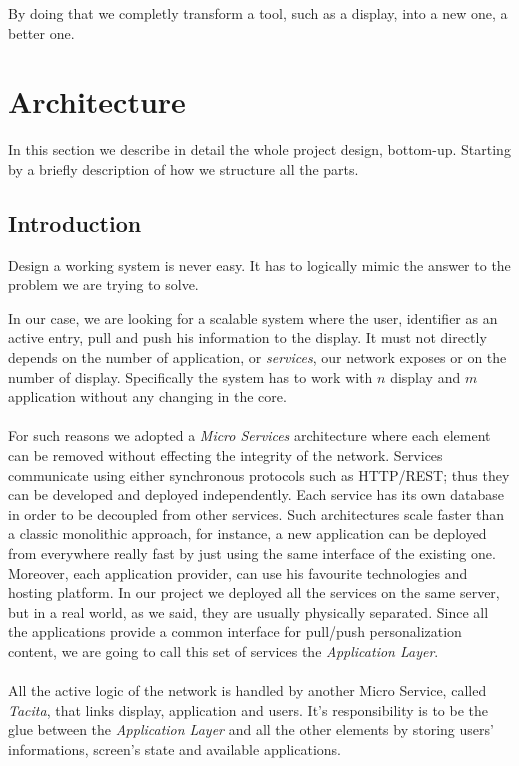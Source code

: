 \documentclass[]{usiinfbachelorproject}
\begin{document}
By doing that we completly transform a tool, such as a display, into a new one, a better one.
\section{Architecture}
In this section we describe in detail the whole project design, bottom-up. Starting by a briefly description of how we structure all the parts.
\subsection{Introduction}
Design a working system is never easy. It has to logically mimic the answer to the problem we are trying to solve.

In our case, we are looking for a scalable system where the user, identifier as an active entry, pull and push his information to the display. It must not directly depends on the number of application, or \emph{services}, our network exposes or on the number of display. Specifically the system has to work with $n$ display and $m$ application without any changing in the core. 
\\
\\
For such reasons we adopted a \emph{Micro Services} architecture where each element can be removed without effecting the integrity of the network. Services communicate using either synchronous protocols such as HTTP/REST; thus they can be developed and deployed independently. Each service has its own database in order to be decoupled from other services. Such architectures scale faster than a classic monolithic approach, for instance, a new application can be deployed from everywhere really fast by just using the same interface of the existing one. Moreover, each application provider, can use his favourite technologies and hosting platform. In our project we deployed all the services on the same server, but in a real world, as we said,  they are usually physically separated. Since all the applications provide a common interface for pull/push personalization content, we are going to call this set of services the \emph{Application Layer}.\\
\\
All the active logic of the network is handled by another Micro Service, called \emph{Tacita}, that links display, application and users. It's responsibility is to be the glue between the \emph{Application Layer} and all the other elements by storing users' informations, screen's state and available applications.
\end{document}

